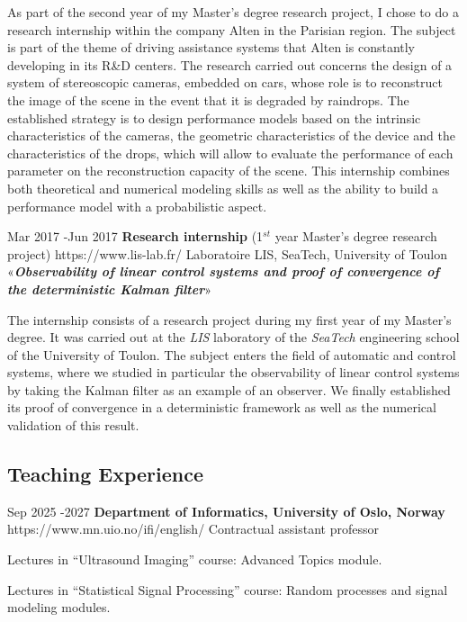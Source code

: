 \documentclass[10pt]{article} %
\begin{document}
{	As part of the second year of my Master's degree research project, I chose to do a research internship within the company Alten in the Parisian region. The subject is part of the theme of driving assistance systems that Alten is constantly developing in its R\&D centers. The research carried out concerns the design of a system of stereoscopic cameras, embedded on cars, whose role is to reconstruct the image of the scene in the event that it is degraded by raindrops. The established strategy is to design performance models based on the intrinsic characteristics of the cameras, the geometric characteristics of the device and the characteristics of the drops, which will allow to evaluate the performance of each parameter on the reconstruction capacity of the scene. This internship combines both theoretical and numerical modeling skills as well as the ability to build a performance model with a probabilistic aspect.

}



\job
{Mar 2017 -}{Jun 2017}
{\textbf{Research internship} (1$^{st}$ year Master's degree research project)}
{https://www.lis-lab.fr/}
{Laboratoire LIS, SeaTech, University of Toulon}
{«\textbf{\textit{Observability of linear control systems and proof of convergence of the deterministic Kalman filter}}»}


{	The internship consists of a research project during my first year of my Master's degree. It was carried out at the \textit{LIS} laboratory of the \textit{SeaTech} engineering school of the University of Toulon. The subject enters the field of automatic and control systems, where we studied in particular the observability of linear control systems by taking the Kalman filter as an example of an observer. We finally established its proof of convergence in a deterministic framework as well as the numerical validation of this result.
	
}

\subsection{Teaching Experience}
\job
{Sep 2025 -}{2027}
{\textbf{Department of Informatics, University of Oslo, Norway}}
{https://www.mn.uio.no/ifi/english/}
{Contractual assistant professor}
{
	\begin{itemize-noindent}
		\item{Lectures in ``Ultrasound Imaging'' course: Advanced Topics module.}
		\item{Lectures in ``Statistical Signal Processing'' course: Random processes and signal modeling modules.}
	\end{itemize-noindent}
}
\end{document}
